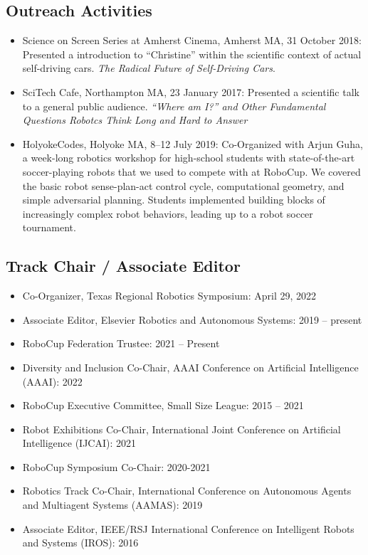 \documentclass[Times]{article}
\begin{document}
\subsection*{Outreach Activities}
\begin{itemize}
\item Science on Screen Series at Amherst Cinema, Amherst MA, 31 October 2018:
Presented a introduction to ``Christine'' within the scientific context of
actual self-driving cars. \emph{The Radical Future of Self-Driving Cars}.
\item SciTech Cafe, Northampton MA, 23 January 2017: Presented a scientific talk
to a general public audience. \emph{``Where am I?'' and
  Other Fundamental Questions Robotcs Think Long and Hard to Answer}
\item HolyokeCodes, Holyoke MA, 8--12 July 2019: Co-Organized with Arjun Guha, a week-long
robotics workshop for high-school students with state-of-the-art soccer-playing
robots that we used to compete with at RoboCup. We
covered the basic robot sense-plan-act control cycle, computational geometry,
and simple adversarial planning. Students implemented building blocks of
increasingly complex robot behaviors, leading up to a robot soccer tournament.
\end{itemize}

\subsection*{Track Chair / Associate Editor}

\begin{itemize}
  \item Co-Organizer, Texas Regional Robotics Symposium: April 29, 2022
  \item Associate Editor, Elsevier Robotics and Autonomous Systems: 2019 -- present
  \item RoboCup Federation Trustee: 2021 -- Present
  \item Diversity and Inclusion Co-Chair, AAAI Conference on Artificial Intelligence (AAAI): 2022
  \item RoboCup Executive Committee, Small Size League: 2015 -- 2021
  \item Robot Exhibitions Co-Chair, International Joint Conference on Artificial Intelligence (IJCAI): 2021
  \item RoboCup Symposium Co-Chair: 2020-2021
\item Robotics Track Co-Chair, International Conference on Autonomous Agents and
Multiagent Systems (AAMAS): 2019
  \item Associate Editor, IEEE/RSJ International Conference on Intelligent
Robots and Systems (IROS): 2016
\end{itemize}
\end{document}
